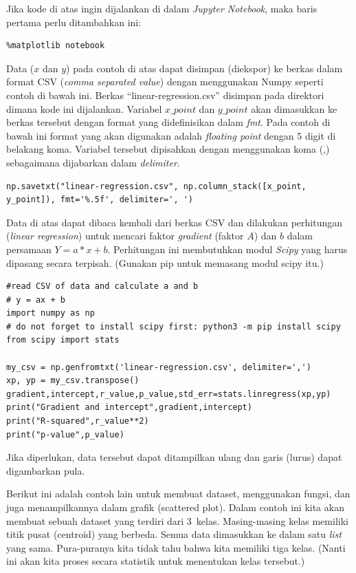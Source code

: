 Jika kode di atas ingin dijalankan di dalam {\em Jupyter Notebook},
maka baris pertama perlu ditambahkan ini:

\begin{verbatim}
%matplotlib notebook
\end{verbatim}

Data ($x$ dan $y$) pada contoh di atas dapat disimpan (diekspor) ke berkas
dalam format CSV ({\em comma separated value}) dengan menggunakan Numpy
seperti contoh di bawah ini.
Berkas ``linear-regression.csv'' disimpan pada direktori dimana kode
ini dijalankan. Variabel $x\_point$ dan $y\_point$ akan dimasukkan ke
berkas tersebut dengan format yang didefinisikan dalam {\em fmt}.
Pada contoh di bawah ini format yang akan digunakan adalah 
{\em floating point} dengan 5 digit di belakang koma.
Variabel tersebut dipisahkan dengan menggunakan koma (,) sebagaimana
dijabarkan dalam {\em delimiter}.

\begin{verbatim}
np.savetxt("linear-regression.csv", np.column_stack([x_point, y_point]), fmt='%.5f', delimiter=', ')
\end{verbatim}

Data di atas dapat dibaca kembali dari berkas CSV dan dilakukan
perhitungan ({\em linear regression}) untuk mencari faktor {\em gradient}
(faktor $A$) dan $b$ dalam persamaan $Y = a*x + b$.
Perhitungan ini membutuhkan modul {\em Scipy} yang harus dipasang
secara terpisah. (Gunakan pip untuk memasang modul scipy itu.)

\begin{verbatim}
#read CSV of data and calculate a and b
# y = ax + b
import numpy as np
# do not forget to install scipy first: python3 -m pip install scipy
from scipy import stats

my_csv = np.genfromtxt('linear-regression.csv', delimiter=',')
xp, yp = my_csv.transpose()
gradient,intercept,r_value,p_value,std_err=stats.linregress(xp,yp)
print("Gradient and intercept",gradient,intercept)
print("R-squared",r_value**2)
print("p-value",p_value)
\end{verbatim}

Jika diperlukan, data tersebut dapat ditampilkan ulang dan garis (lurus)
dapat digambarkan pula.


Berikut ini adalah contoh lain untuk membuat dataset, menggunakan fungsi,
dan juga menampilkannya dalam grafik (scattered plot).
Dalam contoh ini kita akan membuat sebuah dataset yang terdiri dari 3~kelas.
Masing-masing kelas memiliki titik pusat (centroid) yang berbeda.
Semua data dimasukkan ke dalam satu {\em list} yang sama.
Pura-puranya kita tidak tahu bahwa kita memiliki tiga kelas.
(Nanti ini akan kita proses secara statistik untuk menentukan kelas tersebut.)

